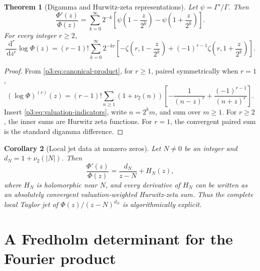 \documentclass[11pt]{article}
\newtheorem{theorem}{Theorem}[section]
\newtheorem{corollary}[theorem]{Corollary}
\theoremstyle{definition}
\theoremstyle{remark}
\newcommand{\dd}{\,\mathrm d}
\begin{document}
\begin{theorem}[Digamma and Hurwitz-zeta representations]\label{p3:thm:hurwitz}
Let \(\psi=\Gamma'/\Gamma\).  Then
\begin{equation}
 \boxed{
 \frac{\Phi'(z)}{\Phi(z)}
 =\sum_{k=0}^{\infty}2^{-k}
 \left[
 \psi\!\left(1-\frac{z}{2^k}\right)
 -\psi\!\left(1+\frac{z}{2^k}\right)
 \right].
 }                                                           \label{p3:eq:logder-digamma}
\end{equation}
For every integer \(r\ge2\),
\begin{equation}
 \boxed{
 \frac{\dd^r}{\dd z^r}\log\Phi(z)
 =(r-1)!\sum_{k=0}^{\infty}2^{-kr}
 \left[
 -\zeta\!\left(r,1-\frac{z}{2^k}\right)
 +(-1)^{r-1}\zeta\!\left(r,1+\frac{z}{2^k}\right)
 \right].
 }                                                           \label{p3:eq:logder-hurwitz}
\end{equation}
\end{theorem}

\begin{proof}
From \eqref{p3:eq:canonical-product}, for \(r\ge1\), paired symmetrically when \(r=1\),
\begin{equation}
 (\log\Phi)^{(r)}(z)
 =(r-1)!\sum_{n\ge1}(1+\nu_2(n))
 \left[-\frac1{(n-z)^r}+\frac{(-1)^{r-1}}{(n+z)^r}\right].   \label{p3:eq:logder-general-zero}
\end{equation}
Insert \eqref{p3:eq:valuation-indicators}, write \(n=2^k m\), and sum over \(m\ge1\).
For \(r\ge2\), the inner sums are Hurwitz zeta functions.  For \(r=1\), the convergent
paired sum is the standard digamma difference.
\end{proof}

\begin{corollary}[Local jet data at nonzero zeros]
Let \(N\ne0\) be an integer and \(d_N=1+\nu_2(|N|)\).  Then
\begin{equation}
 \frac{\Phi'(z)}{\Phi(z)}=\frac{d_N}{z-N}+H_N(z),             \label{p3:eq:local-logder-zero}
\end{equation}
where \(H_N\) is holomorphic near \(N\), and every derivative of \(H_N\) can be written
as an absolutely convergent valuation-weighted Hurwitz-zeta sum.  Thus the complete local
Taylor jet of \(\Phi(z)/(z-N)^{d_N}\) is algorithmically explicit.
\end{corollary}

\section{A Fredholm determinant for the Fourier product}\label{p3:sec:fredholm}
\end{document}
